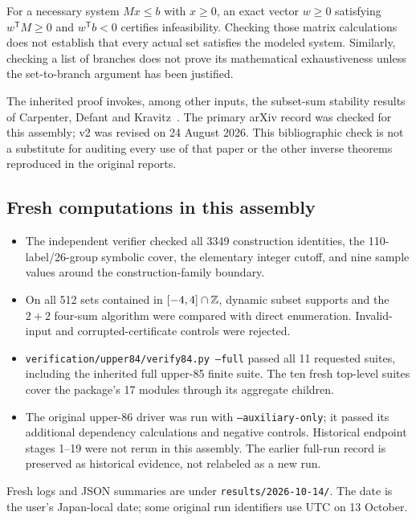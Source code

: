 \documentclass[11pt,a4paper]{article}
\theoremstyle{remark}\newtheorem{remark}[theorem]{Remark}
\begin{document}
For a necessary system $Mx\le b$ with $x\ge0$, an exact vector $w\ge0$ satisfying $w^\mathsf TM\ge0$ and $w^\mathsf Tb<0$ certifies infeasibility. Checking those matrix calculations does not establish that every actual set satisfies the modeled system. Similarly, checking a list of branches does not prove its mathematical exhaustiveness unless the set-to-branch argument has been justified.

The inherited proof invokes, among other inputs, the subset-sum stability results of Carpenter, Defant and Kravitz~\cite{CDK}. The primary arXiv record was checked for this assembly; v2 was revised on 24 August 2026. This bibliographic check is not a substitute for auditing every use of that paper or the other inverse theorems reproduced in the original reports.

\subsection{Fresh computations in this assembly}
\begin{itemize}
\item The independent verifier checked all 3349 construction identities, the 110-label/26-group symbolic cover, the elementary integer cutoff, and nine sample values around the construction-family boundary.
\item On all 512 sets contained in $[-4,4]\cap\mathbb Z$, dynamic subset supports and the $2+2$ four-sum algorithm were compared with direct enumeration. Invalid-input and corrupted-certificate controls were rejected.
\item \texttt{verification/upper84/verify84.py --full} passed all 11 requested suites, including the inherited full upper-85 finite suite. The ten fresh top-level suites cover the package's 17 modules through its aggregate children.
\item The original upper-86 driver was run with \texttt{--auxiliary-only}; it passed its additional dependency calculations and negative controls. Historical endpoint stages 1--19 were not rerun in this assembly. The earlier full-run record is preserved as historical evidence, not relabeled as a new run.
\end{itemize}
Fresh logs and JSON summaries are under \texttt{results/2026-10-14/}. The date is the user's Japan-local date; some original run identifiers use UTC on 13 October.
\end{document}
